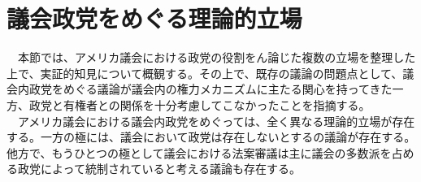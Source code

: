 \documentclass{article}
\begin{document}
\section{議会政党をめぐる理論的立場}
　本節では、アメリカ議会における政党の役割をん論じた複数の立場を整理した上で、実証的知見について概観する。その上で、既存の議論の問題点として、議会内政党をめぐる議論が議会内の権力メカニズムに主たる関心を持ってきた一方、政党と有権者との関係を十分考慮してこなかったことを指摘する。\\
　アメリカ議会における議会内政党をめぐっては、全く異なる理論的立場が存在する。一方の極には、議会において政党は存在しないとする\citet*{Krehbiel1998-ob,Krehbiel2010-ob}の議論が存在する。他方で、もうひとつの極として議会における法案審議は主に議会の多数派を占める政党によって統制されていると考える議論も存在する。\citep*{Rohde1991-da,Aldrich1995-xf,Cox2005-pn,Cox2007-xq}
\end{document}
